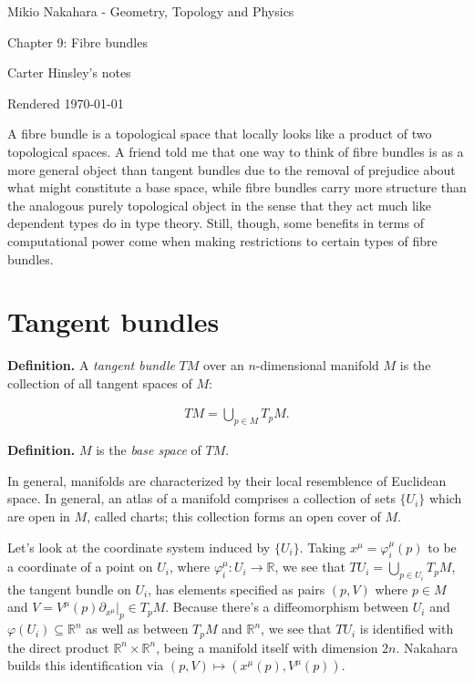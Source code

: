 \documentclass[a4paper]{article}
\newcommand{\R}{\mathbb{R}}
\begin{document}
\begin{center}
\LARGE{Mikio Nakahara - Geometry, Topology and Physics}

\Large{Chapter 9: Fibre bundles}

\large{Carter Hinsley's notes}

Rendered \today
\end{center}

A fibre bundle is a topological space that locally looks like a product of two topological spaces. A friend told me that one way to think of fibre bundles is as a more general object than tangent bundles due to the removal of prejudice about what might constitute a base space, while fibre bundles carry more structure than the analogous purely topological object in the sense that they act much like dependent types do in type theory. Still, though, some benefits in terms of computational power come when making restrictions to certain types of fibre bundles.

\section{Tangent bundles}

\textbf{Definition.} A \emph{tangent bundle} $TM$ over an $n$-dimensional manifold $M$ is the collection of all tangent spaces of $M$:

\begin{align}
    TM = \bigcup_{p \in M} T_pM.
\end{align}

\textbf{Definition.} $M$ is the \emph{base space} of $TM$.

In general, manifolds are characterized by their local resemblence of Euclidean space. In general, an atlas of a manifold comprises a collection of sets $\{U_i\}$ which are open in $M$, called charts; this collection forms an open cover of $M$.

Let's look at the coordinate system induced by $\{U_i\}$. Taking $x^\mu = \varphi_i^\mu(p)$ to be a coordinate of a point on $U_i$, where $\varphi_i^\mu : U_i \to \R$, we see that $\displaystyle TU_i = \bigcup_{p \in U_i} T_pM$, the tangent bundle on $U_i$, has elements specified as pairs $(p, V)$ where $p \in M$ and $V = V^\mu(p)\partial_{x^\mu}|_p \in T_pM$. Because there's a diffeomorphism between $U_i$ and $\varphi(U_i) \subseteq \R^n$ as well as between $T_pM$ and $\R^n$, we see that $TU_i$ is identified with the direct product $\R^n \times \R^n$, being a manifold itself with dimension $2n$. Nakahara builds this identification via $(p, V) \mapsto (x^\mu(p), V^\mu(p))$.
\end{document}
